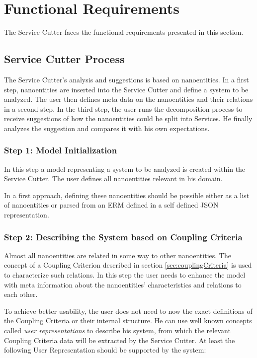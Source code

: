 \section{Functional Requirements}

The Service Cutter faces the functional requirements presented in this
section.


\subsection{Service Cutter Process}

The Service Cutter's analysis and suggestions is based on nanoentities. In a first step, nanoentities are inserted into the Service Cutter and define a system to be analyzed. The user then defines meta data on the nanoentities and their relations in a second step. In the third step, the user runs the decomposition process to receive suggestions of how the nanoentities could be split into Services. He finally analyzes the suggestion and compares it with his own expectations. 

\subsubsection{Step 1: Model Initialization}

In this step a model representing a system to be analyzed is created within the Service Cutter. The user defines all nanoentities relevant in his domain. 

In a first approach, defining these nanoentities should be possible either as a list of nanoentities or parsed from an \gls{ERM} defined in a self defined JSON representation.

\subsubsection{Step 2: Describing the System based on Coupling Criteria}

Almost all nanoentities are related in some way to other nanoentities. The concept of a Coupling Criterion described in section \ref{sec:couplingCriteria} is used to characterize such relations. In this step the user needs to enhance the model with meta information about the nanoentities' characteristics and relations to each other. 

To achieve better usability, the user does not need to now the exact definitions of the Coupling Criteria or their internal structure. He can use well known concepts called \textit{user representations} to describe his system, from which the relevant Coupling Criteria data will be extracted by the Service Cutter. At least the following User Representation should be supported by the system:

